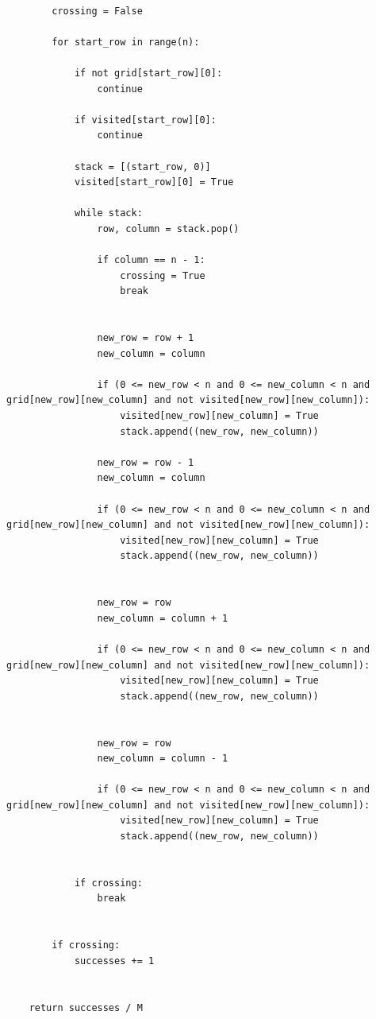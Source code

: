 \documentclass[11pt]{scrartcl}
\begin{document}
\begin{soln}
\begin{lstlisting}[style=pythonStyle]
		
		crossing = False

		for start_row in range(n):
		
			if not grid[start_row][0]:
				continue
		
			if visited[start_row][0]:
				continue
		
			stack = [(start_row, 0)]
			visited[start_row][0] = True
			
			while stack:
				row, column = stack.pop()
	
				if column == n - 1:
					crossing = True
					break
			
			
				new_row = row + 1
				new_column = column
			
				if (0 <= new_row < n and 0 <= new_column < n and grid[new_row][new_column] and not visited[new_row][new_column]):
					visited[new_row][new_column] = True
					stack.append((new_row, new_column))
			
				new_row = row - 1
				new_column = column
			
				if (0 <= new_row < n and 0 <= new_column < n and grid[new_row][new_column] and not visited[new_row][new_column]):
					visited[new_row][new_column] = True
					stack.append((new_row, new_column))
			
	
				new_row = row
				new_column = column + 1
			
				if (0 <= new_row < n and 0 <= new_column < n and grid[new_row][new_column] and not visited[new_row][new_column]):
					visited[new_row][new_column] = True
					stack.append((new_row, new_column))
				
			
				new_row = row
				new_column = column - 1
			
				if (0 <= new_row < n and 0 <= new_column < n and grid[new_row][new_column] and not visited[new_row][new_column]):
					visited[new_row][new_column] = True
					stack.append((new_row, new_column))
				
			
			if crossing:
				break
			
			
		if crossing:
			successes += 1
		
	
	return successes / M


			\end{lstlisting}
			\newpage
			
			\subsubsection*{}
			

\end{soln}
\end{document}
